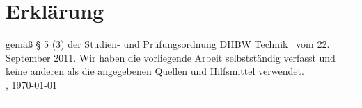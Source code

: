 \chapter*{Erklärung}
gemäß § 5 (3) der \glqq Studien- und Prüfungsordnung DHBW Technik\grqq~ vom 22. September 2011.
Wir haben die vorliegende Arbeit selbstständig verfasst und keine anderen als die angegebenen Quellen und Hilfsmittel verwendet.\\

\location, \today \\[4ex]
\rule[-0.2cm]{14cm}{0.5pt} \\
\textsc{\autor} \\[10ex]


%
%
%














